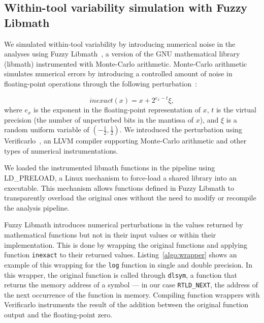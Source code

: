 \documentclass[11pt,onecolumn]{article}
\begin{document}
\subsection{Within-tool variability simulation with Fuzzy Libmath}

We simulated within-tool variability by introducing 
numerical noise in the analyses using
Fuzzy Libmath~\cite{salari2021accurate}, a version of the GNU
mathematical library (libmath) instrumented with Monte-Carlo arithmetic.
Monte-Carlo arithmetic simulates numerical errors
by introducing a controlled amount of noise in floating-point
operations through the following perturbation~\cite{Parker1997-qq}:

\begin{equation} \label{eq:mca_inexact}
  inexact(x) = x + 2^{e_x-t}\xi,
\end{equation}
where $e_x$ is the exponent in the floating-point representation of $x$,
$t$ is the virtual precision (the number of unperturbed bits in the
mantissa of $x$), and $\xi$ is a random uniform variable of
$(-\frac{1}{2}, \frac{1}{2})$. We introduced the perturbation using
Verificarlo~\cite{denis2015verificarlo}, an LLVM compiler supporting Monte-Carlo
arithmetic and other types of numerical instrumentations.

We loaded the instrumented libmath functions in the pipeline using
LD\_PRELOAD, a Linux mechanism to force-load a shared library into an
executable. This mechanism allows functions defined in Fuzzy Libmath to transparently
overload the original ones without the need to modify or recompile the
analysis pipeline.

Fuzzy Libmath introduces numerical perturbations in the values returned by
mathematical functions but not in their input values or within their
implementation. This is done by wrapping the original functions and
applying function \texttt{inexact} to their returned values.
Listing~\ref{algo:wrapper} shows an example of this wrapping for the
\texttt{log} function in single and double precision. In this wrapper, the
original function is called through \texttt{dlsym}, a function that returns
the memory address of a symbol --- in our case \texttt{RTLD\_NEXT}, the
address of the next occurrence of the function in memory. Compiling function wrappers
with Verificarlo instruments the result of the
addition between the original function output and the floating-point zero.


\end{document}
